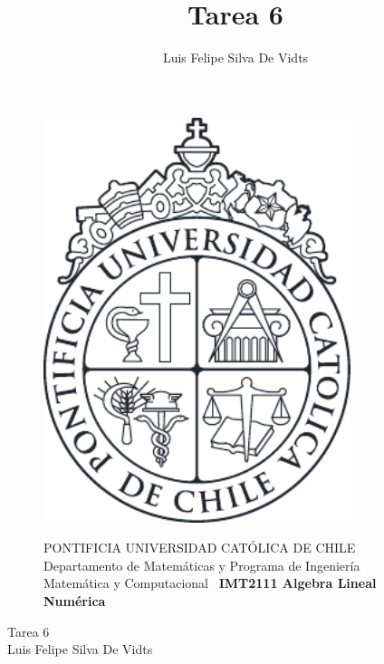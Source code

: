 \documentclass{article}
\title{Tarea 6\\}
\author{Luis Felipe Silva De Vidts}
\begin{document}
\tracingall
\begin{figure}
\begin{minipage}{2.5cm}
\includegraphics[width=0.8\textwidth]{./figures/LogoUC-BN}
\end{minipage}
\begin{minipage}{14.5cm}
\vspace{4mm}
{\sc PONTIFICIA UNIVERSIDAD CAT\'OLICA DE CHILE}\\
Departamento de Matemáticas y Programa de Ingeniería Matemática y Computacional \
{\bf IMT2111 Algebra Lineal Numérica}\\
\vspace{0mm}
\hrulefill
\end{minipage}
\end{figure}
\phantom{""}
\vspace{-5mm}
\normalsize
\begin{center}
\Huge Tarea 6\\
\normalsize Luis Felipe Silva De Vidts
\end{center}
\end{document}

